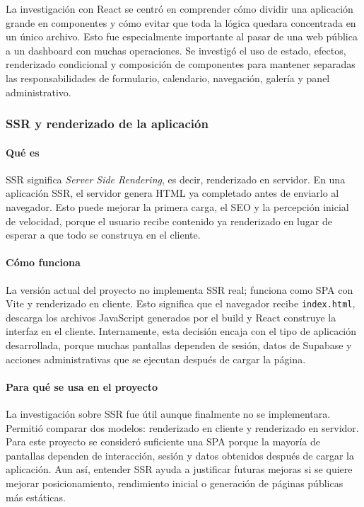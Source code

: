 \documentclass[11pt,a4paper]{article}
\begin{document}
La investigación con React se centró en comprender cómo dividir una aplicación grande en componentes y cómo evitar que toda la lógica quedara concentrada en un único archivo. Esto fue especialmente importante al pasar de una web pública a un dashboard con muchas operaciones. Se investigó el uso de estado, efectos, renderizado condicional y composición de componentes para mantener separadas las responsabilidades de formulario, calendario, navegación, galería y panel administrativo.

\subsubsection{SSR y renderizado de la aplicación}
\paragraph{Qué es}
SSR significa \textit{Server Side Rendering}, es decir, renderizado en servidor. En una aplicación SSR, el servidor genera HTML ya completado antes de enviarlo al navegador. Esto puede mejorar la primera carga, el SEO y la percepción inicial de velocidad, porque el usuario recibe contenido ya renderizado en lugar de esperar a que todo se construya en el cliente.

\paragraph{Cómo funciona}
La versión actual del proyecto no implementa SSR real; funciona como SPA con Vite y renderizado en cliente. Esto significa que el navegador recibe \texttt{index.html}, descarga los archivos JavaScript generados por el build y React construye la interfaz en el cliente. Internamente, esta decisión encaja con el tipo de aplicación desarrollada, porque muchas pantallas dependen de sesión, datos de Supabase y acciones administrativas que se ejecutan después de cargar la página.

\paragraph{Para qué se usa en el proyecto}
La investigación sobre SSR fue útil aunque finalmente no se implementara. Permitió comparar dos modelos: renderizado en cliente y renderizado en servidor. Para este proyecto se consideró suficiente una SPA porque la mayoría de pantallas dependen de interacción, sesión y datos obtenidos después de cargar la aplicación. Aun así, entender SSR ayuda a justificar futuras mejoras si se quiere mejorar posicionamiento, rendimiento inicial o generación de páginas públicas más estáticas.
\end{document}
